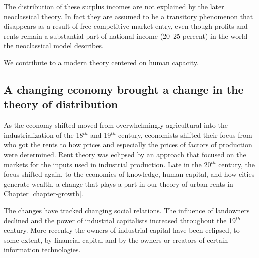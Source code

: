 The distribution of these surplus incomes are not explained by the later neoclassical theory. In fact they are assumed to be a transitory phenomenon that disappears as a result of free competitive market entry, even though profits and rents remain a substantial part of national income (20–25 percent) \cite{GET_Britannica} %
in the world the neoclassical model describes. 



We contribute to a modern theory centered on human capacity.




\subsection{A changing economy brought a change in the theory of distribution}
As the economy shifted  moved from overwhelmingly  agricultural into the industrialization of the 18$^{th}$  and 19$^{th}$ century, economists shifted their focus from who got the rents to how prices and especially the prices of factors of production were determined. Rent theory was eclipsed by an approach that focused on the markets for the inputs used in industrial production.  Late in the 20$^{th}$ century, the focus shifted again, to the economics of  knowledge, human capital, and how cities generate wealth, a change that plays a part in  our theory of urban rents in Chapter \ref{chapter-growth}. 
 
The changes have tracked changing social relations. The influence of landowners declined and the power of  industrial capitalists increased throughout the 19$^{th}$ century. More recently the owners of industrial capital have been eclipsed, to some extent, by financial capital and by the owners or creators of certain information technologies.


